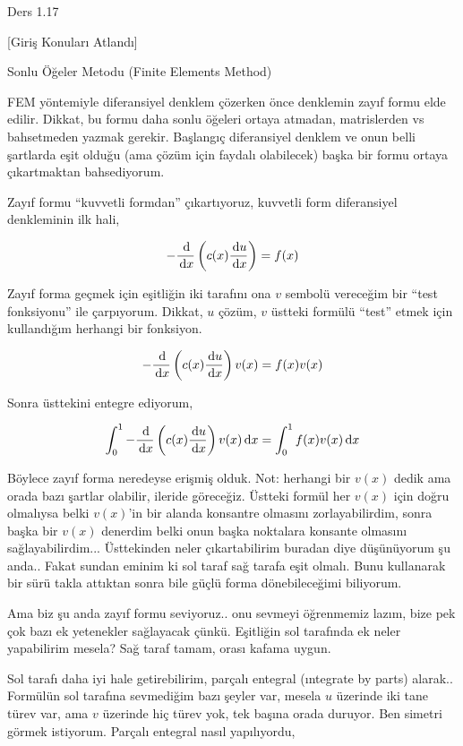\documentclass[12pt,fleqn]{article}\usepackage{../../common}
\begin{document}
Ders 1.17

[Giriş Konuları Atlandı]

Sonlu Öğeler Metodu (Finite Elements Method)

FEM yöntemiyle diferansiyel denklem çözerken önce denklemin zayıf formu elde
edilir. Dikkat, bu formu daha sonlu öğeleri ortaya atmadan, matrislerden vs
bahsetmeden yazmak gerekir. Başlangıç diferansiyel denklem ve onun belli
şartlarda eşit olduğu (ama çözüm için faydalı olabilecek) başka bir formu
ortaya çıkartmaktan bahsediyorum. 

Zayıf formu ``kuvvetli formdan'' çıkartıyoruz, kuvvetli form diferansiyel
denkleminin ilk hali,

$$
- \frac{\,\mathrm{d}}{\,\mathrm{d} x} \left( c(x) \frac{\,\mathrm{d} u}{\,\mathrm{d} x} \right) = f(x)
$$

Zayıf forma geçmek için eşitliğin iki tarafını ona $v$ sembolü vereceğim bir
``test fonksiyonu'' ile çarpıyorum. Dikkat, $u$ çözüm, $v$ üstteki formülü
``test'' etmek için kullandığım herhangi bir fonksiyon. 

$$
- \frac{\,\mathrm{d}}{\,\mathrm{d} x} \left( c(x) \frac{\,\mathrm{d} u}{\,\mathrm{d} x} \right) v(x) =
f(x) v(x)
$$

Sonra üsttekini entegre ediyorum,

$$
\int_{0}^{1} - \frac{\,\mathrm{d}}{\,\mathrm{d} x} \left( c(x) \frac{\,\mathrm{d} u}{\,\mathrm{d} x} \right) v(x) \,\mathrm{d} x=
\int_{0}^{1} f(x) v(x) \,\mathrm{d} x
$$

Böylece zayıf forma neredeyse erişmiş olduk. Not: herhangi bir $v(x)$ dedik ama
orada bazı şartlar olabilir, ileride göreceğiz. Üstteki formül her $v(x)$ için
doğru olmalıysa belki $v(x)$'in bir alanda konsantre olmasını zorlayabilirdim,
sonra başka bir $v(x)$ denerdim belki onun başka noktalara konsante olmasını
sağlayabilirdim... Üsttekinden neler çıkartabilirim buradan diye düşünüyorum şu
anda.. Fakat sundan eminim ki sol taraf sağ tarafa eşit olmalı. Bunu kullanarak
bir sürü takla attıktan sonra bile güçlü forma dönebileceğimi biliyorum.

Ama biz şu anda zayıf formu seviyoruz.. onu sevmeyi öğrenmemiz lazım, bize pek
çok bazı ek yetenekler sağlayacak çünkü. Eşitliğin sol tarafında ek neler
yapabilirim mesela? Sağ taraf tamam, orası kafama uygun.

Sol tarafı daha iyi hale getirebilirim, parçalı entegral (ıntegrate by parts)
alarak.. Formülün sol tarafına sevmediğim bazı şeyler var, mesela $u$ üzerinde
iki tane türev var, ama $v$ üzerinde hiç türev yok, tek başına orada duruyor.
Ben simetri görmek istiyorum. Parçalı entegral nasıl yapılıyordu,
\end{document}
